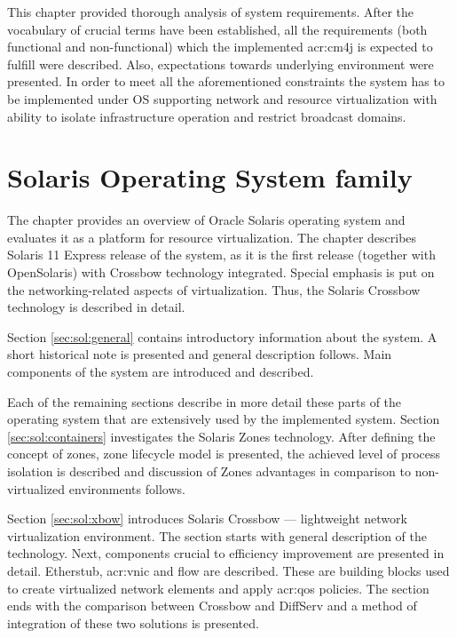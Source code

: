 \documentclass[11pt,openany]{book}
\begin{document}
      This chapter provided thorough analysis of system requirements. After the vocabulary of crucial terms have been
      established, all the requirements (both functional and non-functional) which the implemented \gls{acr:cm4j} is
      expected to fulfill were described. Also, expectations towards underlying environment were presented. In order to
      meet all the aforementioned constraints the system has to be implemented under OS supporting network and resource
      virtualization with ability to isolate infrastructure operation and restrict broadcast domains.


  \chapter{Solaris Operating System family}
  \label{chap:sol}
  
    The chapter provides an overview of Oracle Solaris operating system and evaluates it as a platform for resource
    virtualization. The chapter describes Solaris 11 Express release of the system, as it is the first release (together
    with OpenSolaris) with Crossbow technology integrated. Special emphasis is put on the networking-related aspects of
    virtualization. Thus, the Solaris Crossbow technology is described in detail.

    Section \ref{sec:sol:general} contains introductory information about the system. A short historical note is
    presented and general description follows. Main components of the system are introduced and described.
    
    Each of the remaining sections describe in more detail these parts of the operating system that are extensively used
    by the implemented system. Section \ref{sec:sol:containers} investigates the Solaris Zones technology. After
    defining the concept of zones, zone lifecycle model is presented, the achieved level of process isolation is
    described and discussion of Zones advantages in comparison to non-virtualized environments follows.

    Section \ref{sec:sol:xbow} introduces Solaris Crossbow --- lightweight network virtualization environment. The
    section starts with general description of the technology. Next, components crucial to efficiency improvement are
    presented in detail. Etherstub, \gls{acr:vnic} and flow are described. These are building blocks used to create
    virtualized network elements and apply \gls{acr:qos} policies. The section ends with the comparison between Crossbow
    and DiffServ and a method of integration of these two solutions is presented.
\end{document}
